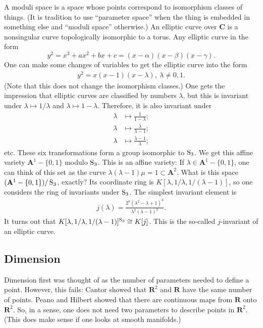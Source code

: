\documentclass [11 pt, oneside] {article}
\begin{document}
\fi
\begin{example}\label{}
A moduli space is a space whose points correspond to isomorphism classes of things. (It is tradition to use ``parameter space'' when the thing is embedded in something else and ``moduli space'' otherwise.) An elliptic curve over $\mathbf{C}$ is a nonsingular curve topologically isomorphic to a torus. Any elliptic curve in the form \[ y^2=x^3+ax^2+bx+c = (x-\alpha) (x-\beta) (x-\gamma).\] One can make some changes of variables to get the elliptic curve into the form
\begin{align*}
	y^2 = x(x-1) (x-\lambda),\ \lambda \ne 0,1.
\end{align*}
(Note that this does not change the isomorphism classes.) One gets the impression that elliptic curves are classified by numbers $\lambda$, but this is invariant under $\lambda\longmapsto 1/\lambda$ and $\lambda \longmapsto 1-\lambda$. Therefore, it is also invariant under
\begin{align*}
	\lambda &\longmapsto \frac{1}{1-\lambda};\\
	\lambda&\longmapsto \frac{\lambda}{\lambda-1};\\
	\lambda&\longmapsto \frac{\lambda-1}{\lambda};
\end{align*}
etc. These six transformations form a group isomorphic to $\operatorname{S}_3$. We get this affine variety $\mathbf{A}^1 - \{0,1\}$ modulo $\operatorname{S}_3$. This is an affine variety: If $\lambda\in \mathbf{A}^1-\{0,1\}$, one can think of this set as the curve $\lambda(\lambda-1)\mu = 1\subset\mathbf{A}^2$. What is this space $(\mathbf{A}^1 - \{0,1\}) / \operatorname{S}_3$, exactly? Its coordinate ring is $K[\lambda, 1/\lambda, 1/(\lambda-1)]$, so one considers the ring of invariants under $\operatorname{S}_3$. The simplest invariant element is 
\begin{align*}
	j(\lambda) =  \frac{2^8(\lambda^2-\lambda+1)^3}{\lambda^2(\lambda-1)^2}.
\end{align*}
It turns out that $K[\lambda, 1/\lambda, 1/(\lambda-1)]^{\operatorname{S}_3} \cong K[j]$. This is the so-called $j$-invariant of an elliptic curve.
\end{example}


\subsection{Dimension}
Dimension first was thought of as the number of parameters needed to define a point. However, this fails: Cantor showed that $\mathbf{R}^2$ and $\mathbf{R}$ have the same number of points. Peano and Hilbert showed that there are continuous maps from $\mathbf{R}$ onto $\mathbf{R}^2$. So, in a sense, one does not need two parameters to describe points in $\mathbf{R}^2$. (This does make sense if one looks at smooth manifolds.)
\end{document}
